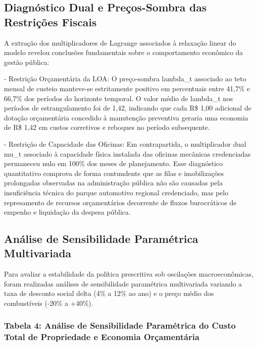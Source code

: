 \documentclass[12pt,a4paper]{article}
\begin{document}
\subsection{Diagnóstico Dual e Preços-Sombra das Restrições Fiscais}

A extração dos multiplicadores de Lagrange associados à relaxação linear do modelo revelou conclusões fundamentais sobre o comportamento econômico da gestão pública:

- Restrição Orçamentária da LOA: O preço-sombra lambda\_t associado ao teto mensal de custeio manteve-se estritamente positivo em percentuais entre 41,7\% e 66,7\% dos períodos do horizonte temporal. O valor médio de lambda\_t nos períodos de estrangulamento foi de 1,42, indicando que cada R\$ 1,00 adicional de dotação orçamentária concedido à manutenção preventiva geraria uma economia de R\$ 1,42 em custos corretivos e reboques no período subsequente.

- Restrição de Capacidade das Oficinas: Em contrapartida, o multiplicador dual mu\_t associado à capacidade física instalada das oficinas mecânicas credenciadas permaneceu nulo em 100\% dos meses de planejamento. Esse diagnóstico quantitativo comprova de forma contundente que as filas e imobilizações prolongadas observadas na administração pública não são causadas pela insuficiência técnica do parque automotivo regional credenciado, mas pelo represamento de recursos orçamentários decorrente de fluxos burocráticos de empenho e liquidação da despesa pública.


\subsection{Análise de Sensibilidade Paramétrica Multivariada}

Para avaliar a estabilidade da política prescritiva sob oscilações macroeconômicas, foram realizadas análises de sensibilidade paramétrica multivariada variando a taxa de desconto social delta (4\% a 12\% ao ano) e o preço médio dos combustíveis (-20\% a +40\%).


\subsubsection{Tabela 4: Análise de Sensibilidade Paramétrica do Custo Total de Propriedade e Economia Orçamentária}
\end{document}
